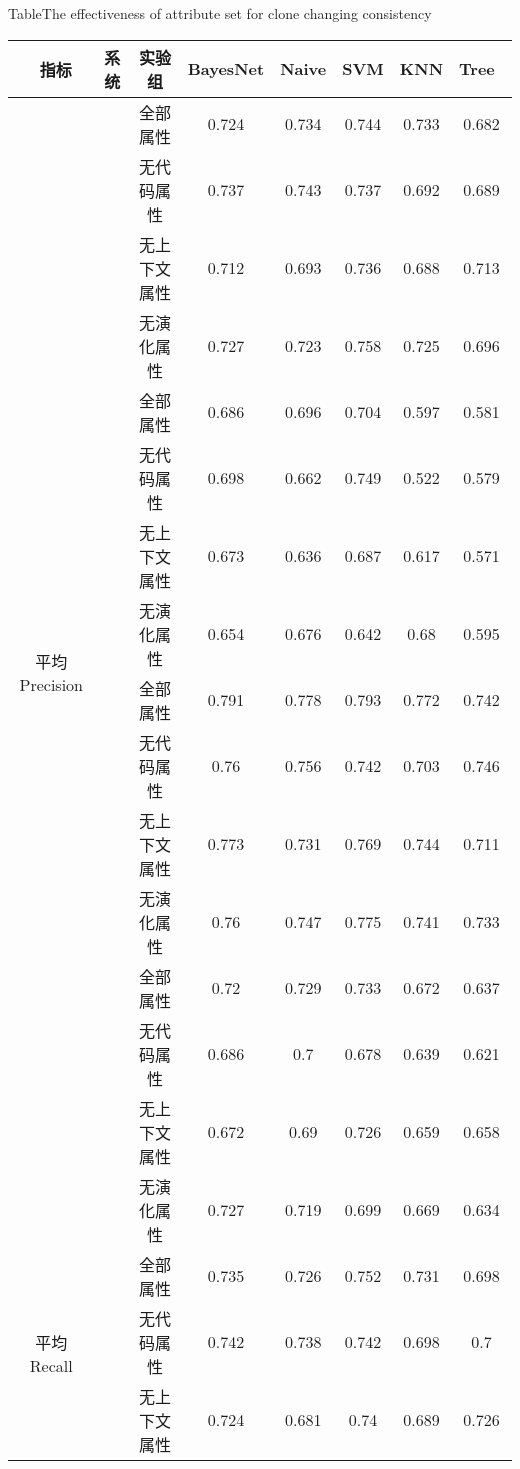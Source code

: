 \begin{table} [htbp]
\renewcommand\arraystretch{0.65} 
{Table$\!$}{The effectiveness of attribute set for clone changing consistency}
\vspace{0.5em}
\centering
\footnotesize
\begin{tabular}{cccccccc}
\toprule[1.5pt]
~{指标}&{系统}&{实验组}&{BayesNet}&{Naive}&{SVM}&{KNN}&{Tree}~\\
\midrule[1pt]
\multirow{16}{*}{平均Precision}
&~\multirow{4}{*}{ArgoUML}
&全部属性& 0.724    & 0.734  & 0.744 & 0.733 & 0.682 \\
&&无代码属性 & 0.737    & 0.743  & 0.737 & 0.692 & 0.689 \\
&&无上下文属性  & 0.712    & 0.693  & 0.736 & 0.688 & 0.713 \\
&&无演化属性 & 0.727    & 0.723  & 0.758 & 0.725 & 0.696 \\
\cline{2-8}
&~\multirow{4}{*}{jEdit}
&全部属性& 0.686    & 0.696  & 0.704 & 0.597 & 0.581 \\
&&无代码属性 & 0.698    & 0.662  & 0.749 & 0.522 & 0.579 \\
&&无上下文属性  & 0.673    & 0.636  & 0.687 & 0.617 & 0.571 \\
&&无演化属性& 0.654    & 0.676  & 0.642 & 0.68  & 0.595 \\
\cline{2-8}
&~\multirow{4}{*}{jFreeChart}
&全部属性  & 0.791    & 0.778  & 0.793 & 0.772 & 0.742 \\
&&无代码属性 & 0.76     & 0.756  & 0.742 & 0.703 & 0.746 \\
&&无上下文属性  & 0.773    & 0.731  & 0.769 & 0.744 & 0.711 \\
&&无演化属性& 0.76     & 0.747  & 0.775 & 0.741 & 0.733 \\
\cline{2-8}
&~\multirow{4}{*}{Tuxguitar} 
&全部属性    & 0.72     & 0.729  & 0.733 & 0.672 & 0.637 \\
&&无代码属性 & 0.686    & 0.7    & 0.678 & 0.639 & 0.621 \\
&&无上下文属性  & 0.672    & 0.69   & 0.726 & 0.659 & 0.658 \\
&&无演化属性& 0.727    & 0.719  & 0.699 & 0.669 & 0.634 \\
\hline
\multirow{16}{*}{平均Recall}&
~\multirow{4}{*}{ArgoUML}
&全部属性   & 0.735    & 0.726  & 0.752 & 0.731 & 0.698 \\
&&无代码属性  & 0.742    & 0.738  & 0.742 & 0.698 & 0.7   \\
&&无上下文属性  & 0.724    & 0.681  & 0.74  & 0.689 & 0.726 \\

\end{tabular}
\end{table}
